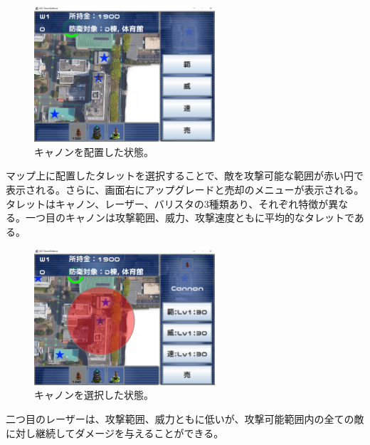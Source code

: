 \documentclass[11pt,a4j]{jarticle}
\begin{document}
\begin{figure}[H]
    \begin{center}
        \leavevmode
        \includegraphics[width=0.6\textwidth]{turretplaced.png}
        \caption{キャノンを配置した状態。}
        \label{fig:turretplaced}
    \end{center}
\end{figure}

マップ上に配置したタレットを選択することで、敵を攻撃可能な範囲が赤い円で表示される。さらに、画面右にアップグレードと売却のメニューが表示される。タレットはキャノン、レーザー、バリスタの3種類あり、それぞれ特徴が異なる。一つ目のキャノンは攻撃範囲、威力、攻撃速度ともに平均的なタレットである。

\begin{figure}[H]
    \begin{center}
        \leavevmode
        \includegraphics[width=0.6\textwidth]{turretrange.png}
        \caption{キャノンを選択した状態。}
        \label{fig:turretrange}
    \end{center}
\end{figure}

二つ目のレーザーは、攻撃範囲、威力ともに低いが、攻撃可能範囲内の全ての敵に対し継続してダメージを与えることができる。
\end{document}
